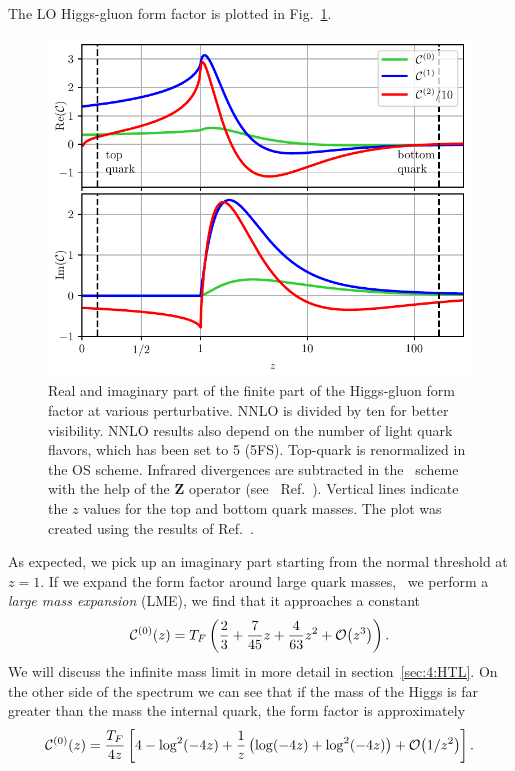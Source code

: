 The \acs{LO} Higgs-gluon form factor is plotted in Fig.~\ref{fig:4:form_factor}.
\begin{figure}[h]
\centering
\includegraphics[width=\figurewidth]{Images/form_factor.pdf}
\caption{Real and imaginary part of the finite part of the Higgs-gluon form factor at various perturbative. \acs{NNLO} is divided by ten for better visibility. \acs{NNLO} results also depend on the number of light quark flavors, which has been set to 5 (5\acs{FS}). Top-quark is renormalized in the \acs{OS} scheme. Infrared divergences are subtracted in the \MS\ scheme with the help of the $\mathbf{Z}$ operator (see \eg\ Ref.~\cite{Czakon:2014oma}). Vertical lines indicate the $z$ values for the top and bottom quark masses. The plot was created using the results of Ref.~\cite{Czakon:2020vql}.}
\label{fig:4:form_factor}
\end{figure}
As expected, we pick up an imaginary part starting from the normal threshold at $z=1$. If we expand the form factor around large quark masses, \ie\ we perform a \textit{large mass expansion} (\acs{LME}), we find that it approaches a constant
\begin{equation}
\mathcal{C}^{(0)}(z) = T_F \left( \frac{2}{3} + \frac{7}{45} z + \frac{4}{63} z^2 + \mathcal{O}\!\left(z^3\right) \right).
\label{eq:4:LME}
\end{equation}
We will discuss the infinite mass limit in more detail in section~\ref{sec:4:HTL}. On the other side of the spectrum we can see that if the mass of the Higgs is far greater than the mass the internal quark, the form factor is approximately
\begin{equation}
\mathcal{C}^{(0)}(z) = \frac{T_F}{4z} \left[ 4 - \log^2\!\left(-4 z \right) + \frac{1}{z} \left( \log\!\left(-4 z \right) + \log^2\!\left(-4 z \right) \right) + \mathcal{O}\!\left(1/z^2\right) \right].
\end{equation}
